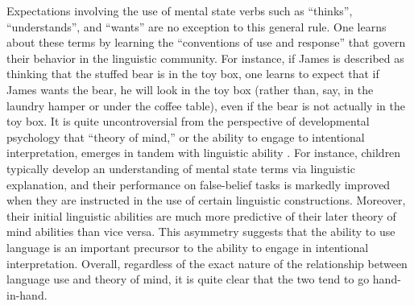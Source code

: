 Expectations involving the use of mental state verbs such as ``thinks'', ``understands'', and ``wants'' are no exception to this general rule. One learns about these terms by learning the ``conventions of use and response'' \citep[][p. 50]{Millikan:2005} that govern their behavior in the linguistic community. For instance, if James is described as  thinking that the stuffed bear is in the toy box, one learns to expect that if James wants the bear, he will look in the toy box (rather than, say, in the laundry hamper or under the coffee table), even if the bear is not actually in the toy box. It is quite uncontroversial from the perspective of developmental psychology that ``theory of mind,'' or the ability to engage to intentional interpretation, emerges in tandem with linguistic ability \citep{Miller:2006}. For instance, children typically develop an understanding of mental state terms via linguistic explanation, and their performance on false-belief tasks is markedly improved when they are instructed in the use of certain linguistic constructions. Moreover, their initial linguistic abilities are much more predictive of their later theory of mind abilities than vice versa. This asymmetry suggests that the ability to use language is an important precursor to the ability to engage in intentional interpretation. Overall, regardless of the exact nature of the relationship between language use and theory of mind, it is quite clear that the two tend to go hand-in-hand.


